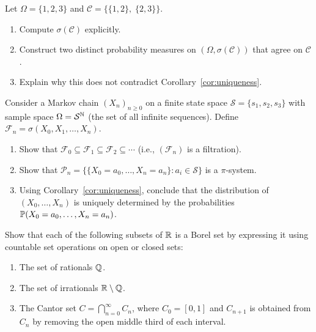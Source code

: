 \documentclass[11pt,a4paper]{article}
\begin{document}
\begin{exercise}
\label{ex:uniqueness_failure}
Let $\Omega = \{1, 2, 3\}$ and
$\mathcal{C} = \bigl\{\{1,2\},\; \{2,3\}\bigr\}$.
\begin{enumerate}[label=(\alph*)]
  \item Compute $\sigma(\mathcal{C})$ explicitly.
  \item Construct two distinct probability measures on
    $(\Omega, \sigma(\mathcal{C}))$ that agree on $\mathcal{C}$.
  \item Explain why this does not contradict
    Corollary~\ref{cor:uniqueness}.
\end{enumerate}
\end{exercise}

\begin{exercise}
\label{ex:filtration}
Consider a Markov chain $(X_n)_{n \geq 0}$ on a finite state space
$\mathcal{S} = \{s_1, s_2, s_3\}$ with sample space
$\Omega = \mathcal{S}^{\mathbb{N}}$ (the set of all infinite sequences).
Define $\mathcal{F}_n = \sigma(X_0, X_1, \ldots, X_n)$.
\begin{enumerate}[label=(\alph*)]
  \item Show that $\mathcal{F}_0 \subseteq \mathcal{F}_1 \subseteq
    \mathcal{F}_2 \subseteq \cdots$ (i.e., $(\mathcal{F}_n)$ is a
    filtration).
  \item Show that
    $\mathcal{P}_n = \bigl\{\{X_0 = a_0, \ldots, X_n = a_n\} :
    a_i \in \mathcal{S}\bigr\}$ is a $\pi$-system.
  \item Using Corollary~\ref{cor:uniqueness}, conclude that the
    distribution of $(X_0, \ldots, X_n)$ is uniquely determined by
    the probabilities $\mathbb{P}(X_0 = a_0, \ldots, X_n = a_n)$.
\end{enumerate}
\end{exercise}

\begin{exercise}
\label{ex:borel_sets}
Show that each of the following subsets of $\mathbb{R}$ is a Borel set by
expressing it using countable set operations on open or closed sets:
\begin{enumerate}[label=(\alph*)]
  \item The set of rationals $\mathbb{Q}$.
  \item The set of irrationals $\mathbb{R} \setminus \mathbb{Q}$.
  \item The Cantor set $C = \bigcap_{n=0}^\infty C_n$, where $C_0 = [0,1]$
    and $C_{n+1}$ is obtained from $C_n$ by removing the open middle
    third of each interval.
\end{enumerate}
\end{exercise}


\end{document}

